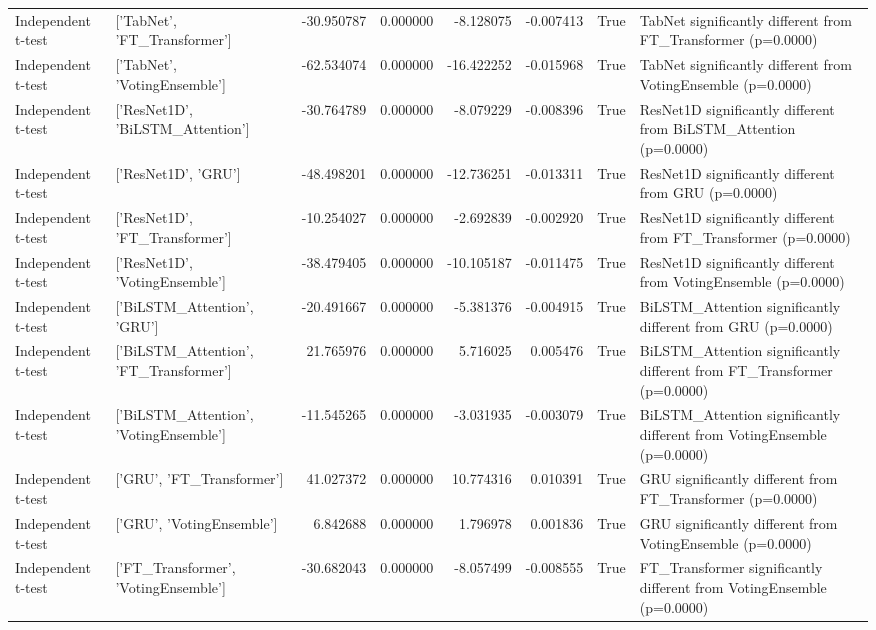 \begin{table}
\begin{tabular}{llrrrrrl}
Independent t-test & ['TabNet', 'FT_Transformer'] & -30.950787 & 0.000000 & -8.128075 & -0.007413 & True & TabNet significantly different from FT_Transformer (p=0.0000) \\
Independent t-test & ['TabNet', 'VotingEnsemble'] & -62.534074 & 0.000000 & -16.422252 & -0.015968 & True & TabNet significantly different from VotingEnsemble (p=0.0000) \\
Independent t-test & ['ResNet1D', 'BiLSTM_Attention'] & -30.764789 & 0.000000 & -8.079229 & -0.008396 & True & ResNet1D significantly different from BiLSTM_Attention (p=0.0000) \\
Independent t-test & ['ResNet1D', 'GRU'] & -48.498201 & 0.000000 & -12.736251 & -0.013311 & True & ResNet1D significantly different from GRU (p=0.0000) \\
Independent t-test & ['ResNet1D', 'FT_Transformer'] & -10.254027 & 0.000000 & -2.692839 & -0.002920 & True & ResNet1D significantly different from FT_Transformer (p=0.0000) \\
Independent t-test & ['ResNet1D', 'VotingEnsemble'] & -38.479405 & 0.000000 & -10.105187 & -0.011475 & True & ResNet1D significantly different from VotingEnsemble (p=0.0000) \\
Independent t-test & ['BiLSTM_Attention', 'GRU'] & -20.491667 & 0.000000 & -5.381376 & -0.004915 & True & BiLSTM_Attention significantly different from GRU (p=0.0000) \\
Independent t-test & ['BiLSTM_Attention', 'FT_Transformer'] & 21.765976 & 0.000000 & 5.716025 & 0.005476 & True & BiLSTM_Attention significantly different from FT_Transformer (p=0.0000) \\
Independent t-test & ['BiLSTM_Attention', 'VotingEnsemble'] & -11.545265 & 0.000000 & -3.031935 & -0.003079 & True & BiLSTM_Attention significantly different from VotingEnsemble (p=0.0000) \\
Independent t-test & ['GRU', 'FT_Transformer'] & 41.027372 & 0.000000 & 10.774316 & 0.010391 & True & GRU significantly different from FT_Transformer (p=0.0000) \\
Independent t-test & ['GRU', 'VotingEnsemble'] & 6.842688 & 0.000000 & 1.796978 & 0.001836 & True & GRU significantly different from VotingEnsemble (p=0.0000) \\
Independent t-test & ['FT_Transformer', 'VotingEnsemble'] & -30.682043 & 0.000000 & -8.057499 & -0.008555 & True & FT_Transformer significantly different from VotingEnsemble (p=0.0000) \\
\bottomrule
\end{tabular}
\end{table}
